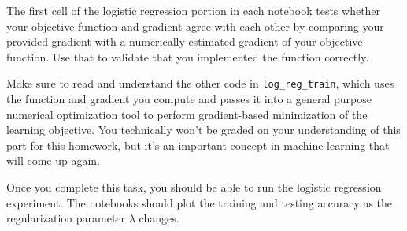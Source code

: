 \documentclass[10pt]{article}
\begin{document}
\begin{enumerate}
The first cell of the logistic regression portion in each notebook tests whether your objective function and gradient agree with each other by comparing your provided gradient with a numerically estimated gradient of your objective function. Use that to validate that you implemented the function correctly. 

Make sure to read and understand the other code in \texttt{log\_reg\_train}, which uses the function and gradient you compute and passes it into a general purpose numerical optimization tool to perform gradient-based minimization of the learning objective. You technically won't be graded on your understanding of this part for this homework, but it's an important concept in machine learning that will come up again.

Once you complete this task, you should be able to run the logistic regression experiment. The notebooks should plot the training and testing accuracy as the regularization parameter $\lambda$ changes. 

\end{enumerate}
\end{document}
